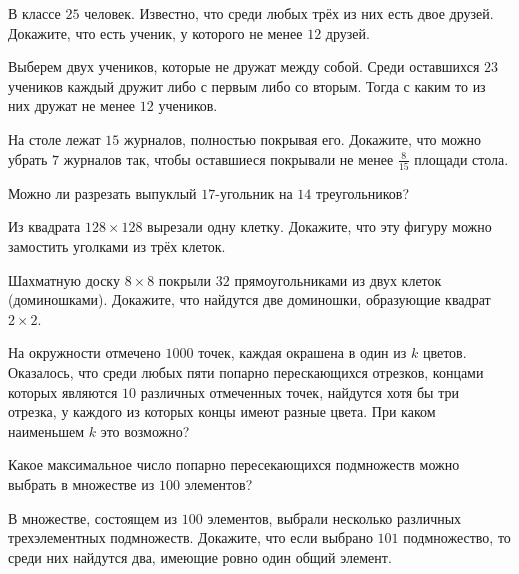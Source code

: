 \documentclass[12pt]{article}
\begin{document}
\begin{task}
В классе $25$ человек. Известно, что среди любых трёх из них есть двое друзей. Докажите, что есть ученик, у которого не менее $12$ друзей.
\end{task}

\begin{solution}
Выберем двух учеников, которые не дружат между собой. Среди оставшихся $23$ учеников каждый дружит либо с первым либо со вторым. Тогда с каким то из них дружат не менее $12$ учеников.
\end{solution}

\begin{task}
На столе лежат $15$ журналов, полностью покрывая его. Докажите, что можно убрать $7$ журналов так, чтобы оставшиеся покрывали не менее $\frac{8}{15}$ площади стола.
\end{task}

\begin{task}
Можно ли разрезать выпуклый $17$-угольник на $14$ треугольников?
\end{task}

\begin{task}
Из квадрата $128 \times 128$ вырезали одну клетку. Докажите, что эту фигуру можно замостить уголками из трёх клеток.
\end{task}

\begin{task}
Шахматную доску $8 \times 8$ покрыли $32$ прямоугольниками из двух клеток (доминошками). Докажите, что найдутся две доминошки, образующие квадрат $2 \times 2$.
\end{task}

\begin{task}
На окружности отмечено $1000$ точек, каждая окрашена в один из $k$ цветов. Оказалось, что среди любых  пяти попарно перескающихся  отрезков, концами которых являются $10$ различных отмеченных точек, найдутся хотя бы три отрезка, у каждого из которых концы имеют разные цвета. При каком наименьшем $k$ это возможно?
\end{task}

\begin{task}
Какое максимальное число попарно пересекающихся подмножеств можно выбрать в множестве из $100$ элементов?
\end{task}

\begin{task}
В множестве, состоящем из $100$ элементов, выбрали несколько различных трехэлементных подмножеств. Докажите, что если выбрано $101$ подмножество, то среди них найдутся два, имеющие ровно один общий элемент.
\end{task}
\end{document}
